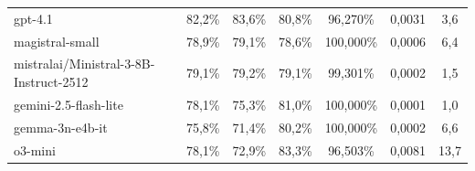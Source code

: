 \documentclass{IEEEphot}
\begin{document}
\begin{table}[t]
\begin{tabular}{|l|c|c|c|c|c|c|}
gpt-4.1                                                                                                   & 82,2\%                                                              & 83,6\%        & 80,8\%           & 96,270\%                                                           & 0,0031                                                              & 3,6                                                                   \\
magistral-small                                                                                           & 78,9\%                                                              & 79,1\%        & 78,6\%           & 100,000\%                                                          & 0,0006                                                              & 6,4                                                                   \\
mistralai/Ministral-3-8B-Instruct-2512                                                                    & 79,1\%                                                              & 79,2\%        & 79,1\%           & 99,301\%                                                           & 0,0002                                                              & 1,5                                                                   \\
gemini-2.5-flash-lite                                                                                     & 78,1\%                                                              & 75,3\%        & 81,0\%           & 100,000\%                                                          & 0,0001                                                              & 1,0                                                                   \\
gemma-3n-e4b-it                                                                                           & 75,8\%                                                              & 71,4\%        & 80,2\%           & 100,000\%                                                          & 0,0002                                                              & 6,6                                                                   \\
o3-mini                                                                                                   & 78,1\%                                                              & 72,9\%        & 83,3\%           & 96,503\%                                                           & 0,0081                                                              & 13,7                                                                  \\

\end{tabular}
\end{table}
\end{document}

